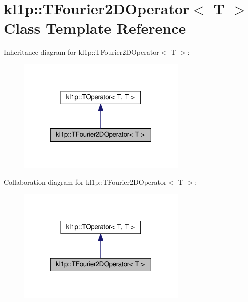 \hypertarget{classkl1p_1_1TFourier2DOperator}{}\section{kl1p\+:\+:T\+Fourier2\+D\+Operator$<$ T $>$ Class Template Reference}
\label{classkl1p_1_1TFourier2DOperator}


Inheritance diagram for kl1p\+:\+:T\+Fourier2\+D\+Operator$<$ T $>$\+:
\nopagebreak
\begin{figure}[H]
\begin{center}
\leavevmode
\includegraphics[width=231pt]{classkl1p_1_1TFourier2DOperator__inherit__graph}
\end{center}
\end{figure}


Collaboration diagram for kl1p\+:\+:T\+Fourier2\+D\+Operator$<$ T $>$\+:
\nopagebreak
\begin{figure}[H]
\begin{center}
\leavevmode
\includegraphics[width=231pt]{classkl1p_1_1TFourier2DOperator__coll__graph}
\end{center}
\end{figure}
